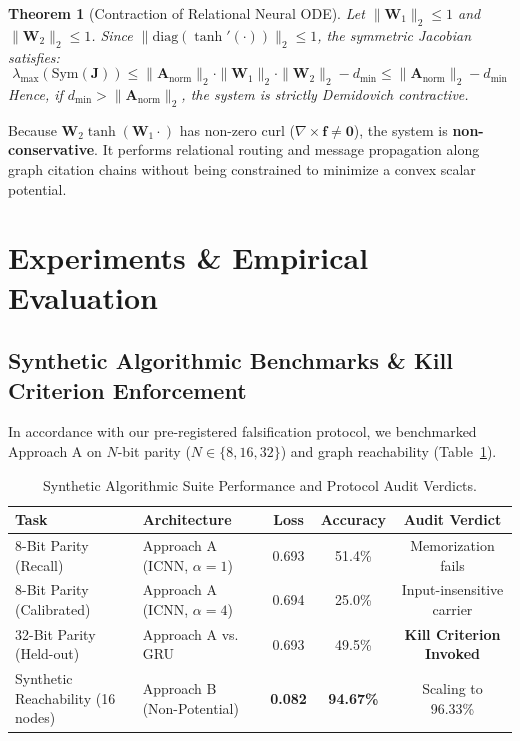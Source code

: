 \documentclass[11pt,a4paper]{article}
\newtheorem{theorem}{Theorem}
\begin{document}
\begin{theorem}[Contraction of Relational Neural ODE]
Let $\|\mathbf{W}_1\|_2 \le 1$ and $\|\mathbf{W}_2\|_2 \le 1$. Since $\|\text{diag}(\tanh'(\cdot))\|_2 \le 1$, the symmetric Jacobian satisfies:
\begin{equation}
\lambda_{\max}(\text{Sym}(\mathbf{J})) \le \|\mathbf{A}_{\text{norm}}\|_2 \cdot \|\mathbf{W}_1\|_2 \cdot \|\mathbf{W}_2\|_2 - d_{\min} \le \|\mathbf{A}_{\text{norm}}\|_2 - d_{\min}
\end{equation}
Hence, if $d_{\min} > \|\mathbf{A}_{\text{norm}}\|_2$, the system is strictly Demidovich contractive.
\end{theorem}

Because $\mathbf{W}_2 \tanh(\mathbf{W}_1 \cdot)$ has non-zero curl ($\nabla \times \mathbf{f} \ne \mathbf{0}$), the system is \textbf{non-conservative}. It performs relational routing and message propagation along graph citation chains without being constrained to minimize a convex scalar potential.

\section{Experiments \& Empirical Evaluation}
\label{sec:experiments}

\subsection{Synthetic Algorithmic Benchmarks \& Kill Criterion Enforcement}
In accordance with our pre-registered falsification protocol, we benchmarked Approach A on $N$-bit parity ($N \in \{8, 16, 32\}$) and graph reachability (Table~\ref{tab:synthetic}).

\begin{table}[ht]
\centering
\caption{Synthetic Algorithmic Suite Performance and Protocol Audit Verdicts.}
\label{tab:synthetic}
\begin{tabular}{llccc}
\toprule
\textbf{Task} & \textbf{Architecture} & \textbf{Loss} & \textbf{Accuracy} & \textbf{Audit Verdict} \\
\midrule
8-Bit Parity (Recall) & Approach A (ICNN, $\alpha=1$) & 0.693 & 51.4\% & Memorization fails \\
8-Bit Parity (Calibrated) & Approach A (ICNN, $\alpha=4$) & 0.694 & 25.0\% & Input-insensitive carrier \\
32-Bit Parity (Held-out) & Approach A vs. GRU & 0.693 & 49.5\% & \textbf{Kill Criterion Invoked} \\
Synthetic Reachability (16 nodes) & Approach B (Non-Potential) & \textbf{0.082} & \textbf{94.67\%} & Scaling to 96.33\% \\
\bottomrule
\end{tabular}
\end{table}
\end{document}
